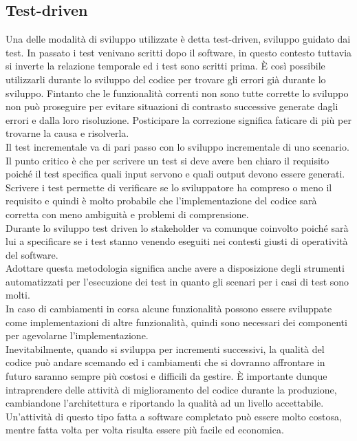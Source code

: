 \subsection{Test-driven}
Una delle modalità di sviluppo utilizzate è detta test-driven, sviluppo guidato dai test.
In passato i test venivano scritti dopo il software, in questo contesto tuttavia si inverte la relazione temporale ed i test sono scritti prima.
È così possibile utilizzarli durante lo sviluppo del codice per trovare gli errori già durante lo sviluppo.
Fintanto che le funzionalità correnti non sono tutte corrette lo sviluppo non può proseguire per evitare situazioni di contrasto successive generate dagli errori e dalla loro risoluzione.
Posticipare la correzione significa faticare di più per trovarne la causa e risolverla.\\
Il test incrementale va di pari passo con lo sviluppo incrementale di uno scenario.
Il punto critico è che per scrivere un test si deve avere ben chiaro il requisito poiché il test specifica quali input servono e quali output devono essere generati.
Scrivere i test permette di verificare se lo sviluppatore ha compreso o meno il requisito e quindi è molto probabile che l'implementazione del codice sarà corretta con meno ambiguità e problemi di comprensione.\\
Durante lo sviluppo test driven lo stakeholder va comunque coinvolto poiché sarà lui a specificare se i test stanno venendo eseguiti nei contesti giusti di operatività del software.\\
Adottare questa metodologia significa anche avere a disposizione degli strumenti automatizzati per l'esecuzione dei test in quanto gli scenari per i casi di test sono molti.\\
In caso di cambiamenti in corsa alcune funzionalità possono essere sviluppate come implementazioni di altre funzionalità, quindi sono necessari dei componenti per agevolarne l'implementazione.\\
Inevitabilmente, quando si sviluppa per incrementi successivi, la qualità del codice può andare scemando ed i cambiamenti che si dovranno affrontare in futuro saranno sempre più costosi e difficili da gestire.
È importante dunque intraprendere delle attività di miglioramento del codice durante la produzione, cambiandone l'architettura e riportando la qualità ad un livello accettabile.
Un'attività di questo tipo fatta a software completato può essere molto costosa, mentre fatta volta per volta risulta essere più facile ed economica.\\

